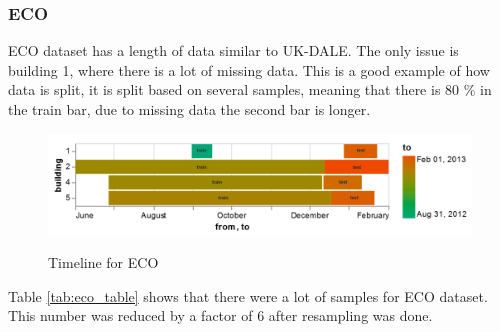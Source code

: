 \subsubsection{ECO}
ECO \cite{ECO} dataset has a length of data similar to UK-DALE. 
The only issue is building 1, where there is a lot of missing data.
This is a good example of how data is split, it is split based on several samples,
meaning that there is 80 \% in the train bar, due to missing data the second bar is longer. 

\begin{figure}[H]
	\centering
	\caption{Timeline for ECO}
	\includegraphics[width=1\textwidth]{Figures/EC/eco_timeline.png}
	\label{fig:eco_timeline}
\end{figure}

Table \ref{tab:eco_table} shows that there were a lot of samples for ECO dataset.
This number was reduced by a factor of 6 after resampling was done.

